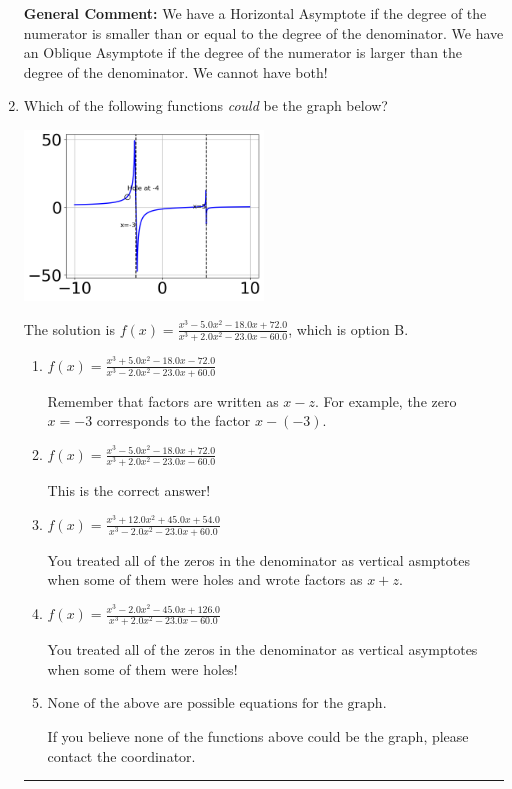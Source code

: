 \documentclass{extbook}[14pt]
\newcommand{\litem}[1]{\item #1

\rule{\textwidth}{0.4pt}}
\begin{document}
\begin{enumerate}
{\textbf{General Comment:} We have a Horizontal Asymptote if the degree of the numerator is smaller than or equal to the degree of the denominator. We have an Oblique Asymptote if the degree of the numerator is larger than the degree of the denominator. We cannot have both!
}
\litem{
Which of the following functions \textit{could} be the graph below?

\begin{center}
    \includegraphics[width=0.5\textwidth]{../Figures/identifyGraphOfRationalFunctionCopyA.png}
\end{center}


The solution is \( f(x)=\frac{x^{3} -5.0 x^{2} -18.0 x + 72.0}{x^{3} +2.0 x^{2} -23.0 x -60.0} \), which is option B.\begin{enumerate}[label=\Alph*.]
\item \( f(x)=\frac{x^{3} +5.0 x^{2} -18.0 x -72.0}{x^{3} -2.0 x^{2} -23.0 x + 60.0} \)

Remember that factors are written as $x-z$. For example, the zero $x=-3$ corresponds to the factor $x-(-3)$.
\item \( f(x)=\frac{x^{3} -5.0 x^{2} -18.0 x + 72.0}{x^{3} +2.0 x^{2} -23.0 x -60.0} \)

This is the correct answer!
\item \( f(x)=\frac{x^{3} +12.0 x^{2} +45.0 x + 54.0}{x^{3} -2.0 x^{2} -23.0 x + 60.0} \)

You treated all of the zeros in the denominator as vertical asmptotes when some of them were holes and wrote factors as $x+z$.
\item \( f(x)=\frac{x^{3} -2.0 x^{2} -45.0 x + 126.0}{x^{3} +2.0 x^{2} -23.0 x -60.0} \)

You treated all of the zeros in the denominator as vertical asymptotes when some of them were holes!
\item \( \text{None of the above are possible equations for the graph.} \)

If you believe none of the functions above could be the graph, please contact the coordinator.
\end{enumerate}

}
\end{enumerate}
\end{document}
